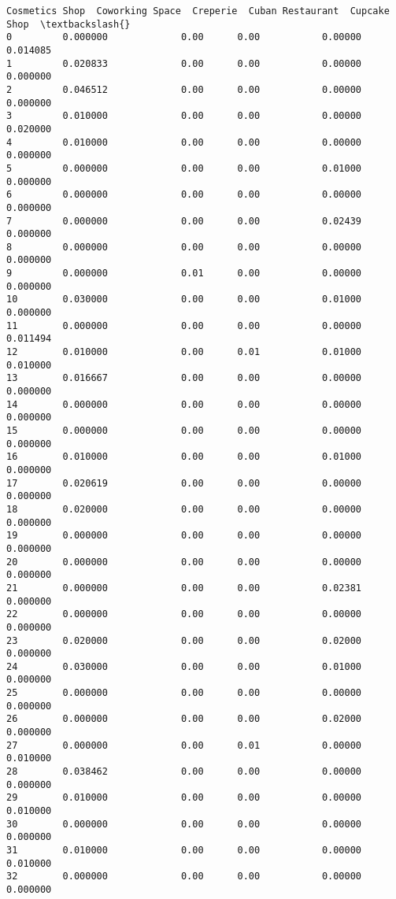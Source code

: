 \documentclass[11pt]{article}
\begin{document}
\begin{tcolorbox}[breakable, size=fbox, boxrule=.5pt, pad at break*=1mm, opacityfill=0]
\begin{Verbatim}[commandchars=\\\{\}]
    Cosmetics Shop  Coworking Space  Creperie  Cuban Restaurant  Cupcake Shop  \textbackslash{}
0         0.000000             0.00      0.00           0.00000      0.014085
1         0.020833             0.00      0.00           0.00000      0.000000
2         0.046512             0.00      0.00           0.00000      0.000000
3         0.010000             0.00      0.00           0.00000      0.020000
4         0.010000             0.00      0.00           0.00000      0.000000
5         0.000000             0.00      0.00           0.01000      0.000000
6         0.000000             0.00      0.00           0.00000      0.000000
7         0.000000             0.00      0.00           0.02439      0.000000
8         0.000000             0.00      0.00           0.00000      0.000000
9         0.000000             0.01      0.00           0.00000      0.000000
10        0.030000             0.00      0.00           0.01000      0.000000
11        0.000000             0.00      0.00           0.00000      0.011494
12        0.010000             0.00      0.01           0.01000      0.010000
13        0.016667             0.00      0.00           0.00000      0.000000
14        0.000000             0.00      0.00           0.00000      0.000000
15        0.000000             0.00      0.00           0.00000      0.000000
16        0.010000             0.00      0.00           0.01000      0.000000
17        0.020619             0.00      0.00           0.00000      0.000000
18        0.020000             0.00      0.00           0.00000      0.000000
19        0.000000             0.00      0.00           0.00000      0.000000
20        0.000000             0.00      0.00           0.00000      0.000000
21        0.000000             0.00      0.00           0.02381      0.000000
22        0.000000             0.00      0.00           0.00000      0.000000
23        0.020000             0.00      0.00           0.02000      0.000000
24        0.030000             0.00      0.00           0.01000      0.000000
25        0.000000             0.00      0.00           0.00000      0.000000
26        0.000000             0.00      0.00           0.02000      0.000000
27        0.000000             0.00      0.01           0.00000      0.010000
28        0.038462             0.00      0.00           0.00000      0.000000
29        0.010000             0.00      0.00           0.00000      0.010000
30        0.000000             0.00      0.00           0.00000      0.000000
31        0.010000             0.00      0.00           0.00000      0.010000
32        0.000000             0.00      0.00           0.00000      0.000000

\end{Verbatim}
\end{tcolorbox}
\end{document}

